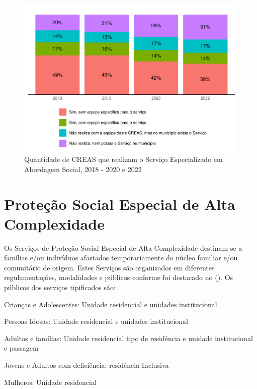\documentclass[
  brazilian]{report}
\begin{document}
\begin{figure}
\includegraphics{Censo-SUAS-2022_files/figure-latex/CREAS-abordagem-social-1} \caption[Quantidade de CREAS que realizam o Serviço Especializado em Abordagem Social, 2018 - 2020 e 2022]{Quantidade de CREAS que realizam o Serviço Especializado em Abordagem Social, 2018 - 2020 e 2022}\label{fig:CREAS-abordagem-social}
\end{figure}

\hypertarget{proteuxe7uxe3o-social-especial-de-alta-complexidade}{%
\section{Proteção Social Especial de Alta
Complexidade}\label{proteuxe7uxe3o-social-especial-de-alta-complexidade}}

Os Serviços de Proteção Social Especial de Alta Complexidade destinam-se
a famílias e/ou indivíduos afastados temporariamente do núcleo familiar
e/ou comunitário de origem. Estes Serviços são organizados em diferentes
regulamentações, modalidades e públicos conforme foi destacado no
(). Os públicos dos serviços tipificados são:

Crianças e Adolescentes: Unidade residencial e unidades institucional

Pessoas Idosas: Unidade residencial e unidades institucional

Adultos e famílias: Unidade residencial tipo de residência e unidade
institucional e passagem

Jovens e Adultos com deficiência: residência Inclusiva

Mulheres: Unidade residencial
\end{document}
